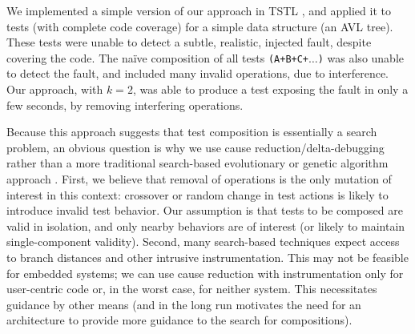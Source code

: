 We implemented a simple version of our approach in TSTL \cite{tstlsttt}, and applied
it to tests (with complete code coverage) for a simple
data structure (an AVL tree).  These tests were unable to detect a
subtle, realistic, injected fault, despite covering the code. The
na\"ive composition of all tests {\tt (A+B+C+$\ldots$)} was also unable
to detect the fault, and included many invalid operations, due to
interference.  Our approach, with $k = 2$, was able to produce a test
exposing the fault in only a few seconds, by removing interfering
operations.

Because this approach suggests that test composition is essentially a
search problem, an obvious question is why we use cause
reduction/delta-debugging rather than a more traditional search-based
evolutionary or genetic algorithm approach \cite{searchtest,McMinn04search-basedsoftware,FA11}.  First, we believe that
removal of operations is the only mutation of interest in this
context: crossover or random change in test actions is likely to
introduce invalid test behavior.  Our assumption is that tests to be
composed are valid in isolation, and only nearby behaviors are of
interest (or likely to maintain single-component validity).  Second,
many search-based techniques expect access to branch distances and
other intrusive instrumentation.  This may not be feasible for
embedded systems; we can use cause reduction with instrumentation only
for user-centric code or, in the worst case, for neither system.  This
necessitates guidance by other means (and in the long run motivates the need for an architecture to provide more guidance to the search for compositions).

